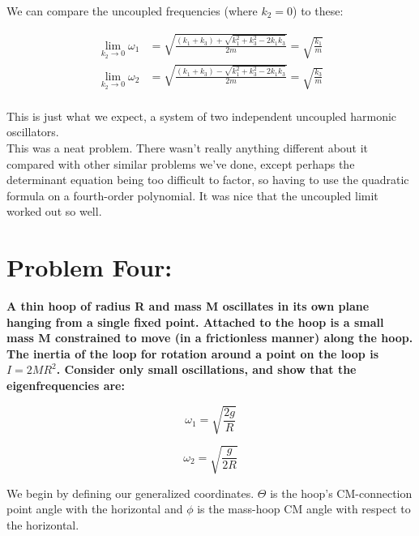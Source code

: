 \documentclass[10pt]{article} %
\begin{document}
We can compare the uncoupled frequencies (where $k_2=0$) to these:

\begin{align*}
  \lim_{k_2\rightarrow0}\omega_1 &= \sqrt{\frac{\left(k_1+k_3\right) + \sqrt{k_1^2+k_3^2-2k_1k_3}}{2m}} = \sqrt{\frac{k_1}{m}}\\
  \lim_{k_2\rightarrow0}\omega_2 &= \sqrt{\frac{\left(k_1+k_3\right) - \sqrt{k_1^2+k_3^2-2k_1k_3}}{2m}} = \sqrt{\frac{k_3}{m}}\\
\end{align*}

This is just what we expect, a system of two independent uncoupled harmonic oscillators.\\

This was a neat problem. There wasn't really anything different about it compared with other similar problems we've done, except perhaps the determinant equation being too difficult to factor, so having to use the quadratic formula on a fourth-order polynomial. It was nice that the uncoupled limit worked out so well.\\

\section{Problem Four: }
\textbf{A thin hoop of radius R and mass M oscillates in its own plane hanging from a single fixed point. Attached to the hoop is a small mass M constrained to move (in a frictionless manner) along the hoop. The inertia of the loop for rotation around a point on the loop is $I=2MR^2$. Consider only small oscillations, and show that the eigenfrequencies are:}

\begin{equation*}
  \omega_1 = \sqrt{\frac{2g}{R}}
\end{equation*}

\begin{equation*}
  \omega_2 = \sqrt{\frac{g}{2R}}
\end{equation*}

We begin by defining our generalized coordinates. $\Theta$ is the hoop's CM-connection point angle with the horizontal and $\phi$ is the mass-hoop CM angle with respect to the horizontal.
\end{document}
